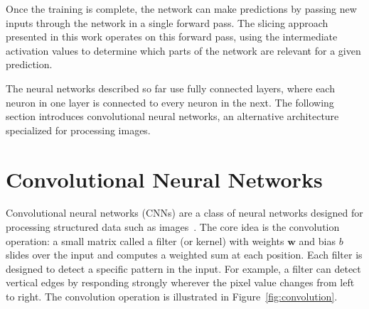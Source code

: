 \documentclass[
12pt,
fancyheadings,
a4paper,
twoside,
BCOR=0.7cm,
nobcorignoretitle,
grayscalebody,
]{stsreprt}
\begin{document}
Once the training is complete, the network can make predictions by passing new inputs through the
network in a single forward pass.
The slicing approach presented in this work operates on this forward pass, using the intermediate
activation values to determine which parts of the network are relevant for a given prediction.

The neural networks described so far use fully connected layers, where each neuron in one layer is
connected to every neuron in the next.
The following section introduces convolutional neural networks, an alternative architecture
specialized for processing images.

\section{Convolutional Neural Networks}

Convolutional neural networks (CNNs) are a class of neural networks designed for processing
structured data such as images~\cite{lecun1998gradient}.
The core idea is the convolution operation: a small matrix called a filter (or kernel) with weights
$\mathbf{w}$ and bias $b$ slides over the input and computes a weighted sum at each position.
Each filter is designed to detect a specific pattern in the input.
For example, a filter can detect vertical edges by responding strongly wherever the pixel value
changes from left to right.
The convolution operation is illustrated in Figure~\ref{fig:convolution}.
\end{document}
